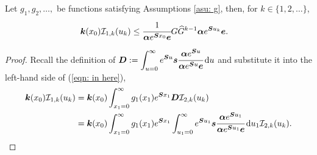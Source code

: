 \begin{lem}\label{lem: lh bnd}
	Let \(g_1, g_2, \dots,\) be functions satisfying Assumptions \ref{asu: g}, then, for \(k\in\{1,2,\dots\}\), 
	\begin{align}
		\boldsymbol k(x_0)\mathcal I_{1,k}(u_k) 
            	&\leq \cfrac{1}{\boldsymbol \alpha e^{\boldsymbol{S}x_0}\boldsymbol e}G\widehat G^{k-1} \boldsymbol \alpha e^{\boldsymbol{S}u_k}\boldsymbol e.\label{eqn: in here}
	\end{align}
\end{lem}
\begin{proof}
	Recall the definition of \(\boldsymbol{D}:=\displaystyle\int_{u=0}^\infty e^{\boldsymbol{S}u}\boldsymbol s \cfrac{\boldsymbol \alpha e^{\boldsymbol{S}u}}{\boldsymbol \alpha e^{\boldsymbol{S}u}\boldsymbol e}\, \mathrm{d} u\) and substitute it into the left-hand side of (\ref{eqn: in here}), 
	\begin{align*}
		\boldsymbol k(x_0) \mathcal I_{1,k}(u_k) &=\boldsymbol k(x_0) \int_{x_1=0}^\infty g_1(x_1) e^{\boldsymbol{S}x_1} \boldsymbol{D} \mathcal I_{2,k}(u_k)
		\\&=\boldsymbol k(x_0)\int_{x_1=0}^\infty g_1(x_1) e^{\boldsymbol{S}x_1} \int_{u_1=0}^\infty e^{\boldsymbol{S}u_1}\boldsymbol s \cfrac{\boldsymbol \alpha e^{\boldsymbol{S}u_1}}{\boldsymbol \alpha e^{\boldsymbol{S}u_1}\boldsymbol e}\, \mathrm{d} u_1 \mathcal I_{2,k}(u_k).
	\end{align*}
	

\end{proof}
